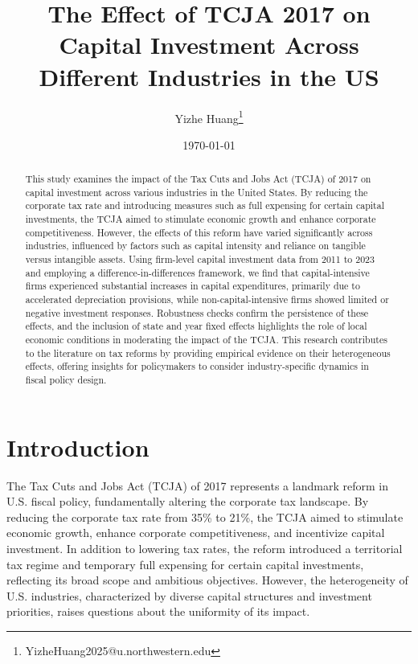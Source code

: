 \documentclass[11pt]{article}
\title{The Effect of TCJA 2017 on Capital Investment Across Different Industries in the US}
\author{Yizhe Huang\footnote{YizheHuang2025@u.northwestern.edu}}
\date{\today}
\begin{document}
\maketitle
\begin{abstract}  
This study examines the impact of the Tax Cuts and Jobs Act (TCJA) of 2017 on capital investment across various industries in the United States. By reducing the corporate tax rate and introducing measures such as full expensing for certain capital investments, the TCJA aimed to stimulate economic growth and enhance corporate competitiveness. However, the effects of this reform have varied significantly across industries, influenced by factors such as capital intensity and reliance on tangible versus intangible assets. Using firm-level capital investment data from 2011 to 2023 and employing a difference-in-differences framework, we find that capital-intensive firms experienced substantial increases in capital expenditures, primarily due to accelerated depreciation provisions, while non-capital-intensive firms showed limited or negative investment responses. Robustness checks confirm the persistence of these effects, and the inclusion of state and year fixed effects highlights the role of local economic conditions in moderating the impact of the TCJA. This research contributes to the literature on tax reforms by providing empirical evidence on their heterogeneous effects, offering insights for policymakers to consider industry-specific dynamics in fiscal policy design.  
\end{abstract}  
\thispagestyle{empty}
\newpage
\tableofcontents
\thispagestyle{empty}
\newpage

\section{Introduction}

The Tax Cuts and Jobs Act (TCJA) of 2017 represents a landmark reform in U.S. fiscal policy, fundamentally altering the corporate tax landscape. By reducing the corporate tax rate from 35\% to 21\%, the TCJA aimed to stimulate economic growth, enhance corporate competitiveness, and incentivize capital investment. In addition to lowering tax rates, the reform introduced a territorial tax regime and temporary full expensing for certain capital investments, reflecting its broad scope and ambitious objectives. However, the heterogeneity of U.S. industries, characterized by diverse capital structures and investment priorities, raises questions about the uniformity of its impact.
\end{document}
